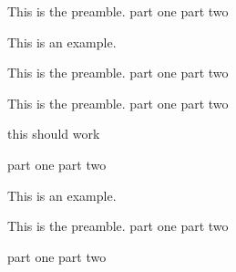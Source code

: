 \pex
This is the preamble.
\a part one
\a part two
\xe

\hfil

\ex This is an example.\xe

\pex
This is the preamble.
\a part one
\a part two
\xe





\pex
This is the preamble.
\a part one
\a part two
\xe

\resetexcnt
\pex
this should work
\xe

\pex
\a part one
\a part two
\xe



\endgroup

\ex This is an example.\xe

\pex
This is the preamble.
\a part one
\a part two
\xe

\pex
\a part one
\a part two
\xe







